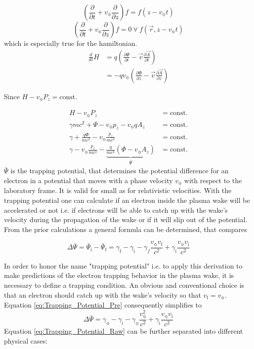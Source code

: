 \begin{equation}
(\frac{\partial}{\partial t}+v_\mathrm{\phi} \frac{\partial}{\partial z} ) f =   f ( z-v_\mathrm{\phi} t)
\end{equation}\begin{equation}
(\frac{\partial}{\partial t}+v_\mathrm{\phi} \frac{\partial}{\partial z} ) f =0 \ \forall \   f (\vec{r}, z-v_\mathrm{\phi} t)
\end{equation}
which is especially true for the hamiltonian.
\begin{align*}
\frac{d}{dt}H&=q(\frac{\partial \Phi}{\partial t}-\vec{v}\frac{\partial \vec{A}}{\partial t})\\
&=-q v_\mathrm{\phi}(\frac{\partial \Phi}{\partial z}-\vec{v} \frac{\partial \vec{A}}{\partial z}) 
\end{align*}

Since $H-v_\mathrm{\phi}P_z=\mathrm{const.}$

\begin{align}
H-v_\mathrm{\phi}P_z &= \mathrm{const.}\\
\gamma m c^2+\Psi-v_\mathrm{\phi}p_z-v_\mathrm{\phi}qA_z &= \mathrm{const.}\\
\gamma+\frac{q \Phi}{m c^2}-v_\mathrm{\phi} \frac{p_z}{mc^2} &= \mathrm{const.}\\
\gamma - v_\mathrm{\phi} \frac{p_z}{mc^2}- \underbrace{\frac{q}{mc^2}(\Phi-v_\mathrm{\phi}A_z)}_{\bar{\Psi}}  &= \mathrm{const.} 
\end{align}
$\bar{\Psi}$ is the trapping potential, that determines the potential difference for an electron in a potential that moves with a phase velocity $v_\mathrm{\phi}$ with respect to the laboratory frame. It is valid for small as for relativistic velocities.
With the trapping potential one can calculate if an electron inside the plasma wake will be accelerated or not i.e. if electrons will be able to catch up with the wake's velocity during the propagation of the wake or if it will slip out of the potential.
From the prior calculations a general formula can be determined, that compares

\begin{equation}
\label{eq:Trapping_Potential_Pre}
\Delta \bar{\Psi}= \bar{\Psi}_\mathrm{i}-\bar{\Psi}_\mathrm{f}=\gamma_\mathrm{f}-\gamma_\mathrm{i}-\gamma_f\frac{v_\mathrm{\phi}v_\mathrm{f}}{c^2}+\gamma_\mathrm{i}\frac{v_\mathrm{\phi}v_\mathrm{i}}{c^2} 
\end{equation}

In order to honor the name "trapping potential" i.e. to apply this derivation to make predictions of the electron trapping behavior in the plasma wake, it is necessary to define a trapping condition. 
An obvious and conventional choice is that an electron should catch up with the wake's velocity so that 
$v_\mathrm{f}=v_\mathrm{\phi}$.
Equation \ref{eq:Trapping_Potential_Pre} consequently simplifies to 
\begin{equation}
\label{eq:Trapping_Potential_Raw}
\Delta \bar{\Psi}= \gamma_\mathrm{\phi}-\gamma_\mathrm{i}-\gamma_\mathrm{\phi}\frac{v_\mathrm{\phi}^2}{c^2}+\gamma_\mathrm{i}\frac{v_\mathrm{\phi}v_\mathrm{i}}{c^2} 
\end{equation}
Equation \ref{eq:Trapping_Potential_Raw} can be further separated into different physical cases:
